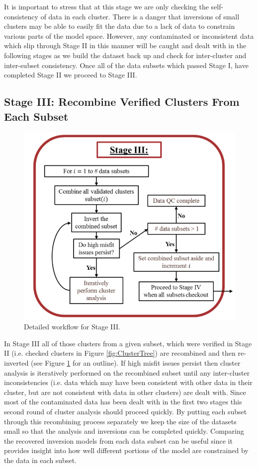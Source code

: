 \documentclass[final,authoryear,5p,times,twocolumn]{elsarticle}
\begin{document}
It is important to stress that at this stage we are only checking the self-consistency of data in each cluster. There is a danger that inversions of small clusters may be able to easily fit the data due to a lack of data to constrain various parts of the model space. However, any contaminated or inconsistent data which slip through Stage II in this manner will be caught and dealt with in the following stages as we build the dataset back up and check for inter-cluster and inter-subset consistency. Once all of the data subsets which passed Stage I, have completed Stage II we proceed to Stage III.

\subsection{Stage III: Recombine Verified Clusters From Each Subset}
\label{Data_Quality_Control:StageIII_Recombine_Clusters}

\begin{figure} [!ht]
\begin{center}
   \includegraphics[trim=0cm 0cm 0cm 0cm, clip=true,width=0.8\linewidth]{./Figures/Fig15.png}
\end{center}
\caption{Detailed workflow for Stage III.}
\label{fig:DataQC_workflow_StageIII}
\end{figure}

In Stage III all of those clusters from a given subset, which were verified in Stage II (i.e. checked clusters in Figure \ref{fig:ClusterTree}) are recombined and then re-inverted (see Figure \ref{fig:DataQC_workflow_StageIII} for an outline). If high misfit issues persist then cluster analysis is iteratively performed on the recombined subset until any inter-cluster inconsistencies (i.e. data which may have been consistent with other data in their cluster, but are not consistent with data in other clusters) are dealt with. Since most of the contaminated data has been dealt with in the first two stages this second round of cluster analysis should proceed quickly. By putting each subset through this recombining process separately we keep the size of the datasets small so that the analysis and inversions can be completed quickly. Comparing the recovered inversion models from each data subset can be useful since it provides insight into how well different portions of the model are constrained by the data in each subset.
\end{document}
